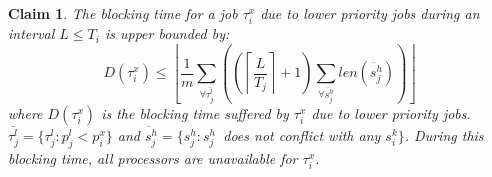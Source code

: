 \documentclass[a4paper,english]{article}
\newtheorem{clm}{Claim}
\begin{document}
\begin{clm}\label{delay}
The blocking time for a job $\tau_{i}^{x}$ due to lower priority jobs 
during an interval $L\le T_{i}$ is upper bounded by:
\begin{equation}
D(\tau_{i}^{x})\le\left\lfloor \frac{1}{m}\sum_{\forall\bar{\tau_{j}^{l}}}\left(\left(\left\lceil \frac{L}{T_{j}}\right\rceil +1\right)\sum_{\forall\ddot{s_{j}^{h}}}len\left(\ddot{s_{j}^{h}}\right)\right)\right\rfloor \label{PNF-delay}
\end{equation}
where $D(\tau_{i}^{x})$ is the blocking time 
suffered by $\tau_{i}^{x}$
due to lower priority jobs. $\bar{\tau_{j}^{l}}=\{\tau_{j}^{l}:p_{j}^{l}<p_{i}^{x}\}$
and $\ddot{s_{j}^{h}}=\{s_{j}^{h}:s_{j}^{h}\,$ \textit{does not conflict with any} $s_{i}^{k}\}$.
During this blocking time, all processors are unavailable for $\tau_{i}^{x}$.
\end{clm}
\end{document}
